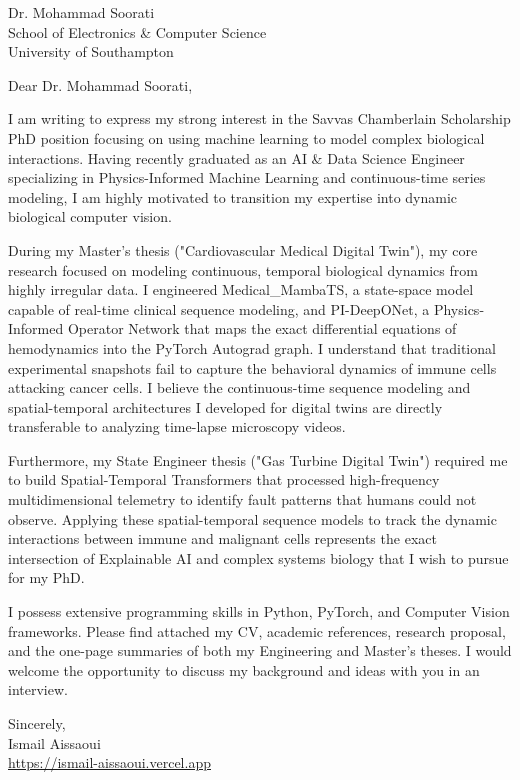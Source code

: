 \documentclass[11pt, a4paper]{letter}
\begin{document}
\begin{letter}{Dr. Mohammad Soorati \\ School of Electronics \& Computer Science \\ University of Southampton}
\opening{Dear Dr. Mohammad Soorati,}

I am writing to express my strong interest in the Savvas Chamberlain Scholarship PhD position focusing on using machine learning to model complex biological interactions. Having recently graduated as an AI \& Data Science Engineer specializing in Physics-Informed Machine Learning and continuous-time series modeling, I am highly motivated to transition my expertise into dynamic biological computer vision.

During my Master's thesis ("Cardiovascular Medical Digital Twin"), my core research focused on modeling continuous, temporal biological dynamics from highly irregular data. I engineered Medical\_MambaTS, a state-space model capable of real-time clinical sequence modeling, and PI-DeepONet, a Physics-Informed Operator Network that maps the exact differential equations of hemodynamics into the PyTorch Autograd graph. I understand that traditional experimental snapshots fail to capture the behavioral dynamics of immune cells attacking cancer cells. I believe the continuous-time sequence modeling and spatial-temporal architectures I developed for digital twins are directly transferable to analyzing time-lapse microscopy videos.

Furthermore, my State Engineer thesis ("Gas Turbine Digital Twin") required me to build Spatial-Temporal Transformers that processed high-frequency multidimensional telemetry to identify fault patterns that humans could not observe. Applying these spatial-temporal sequence models to track the dynamic interactions between immune and malignant cells represents the exact intersection of Explainable AI and complex systems biology that I wish to pursue for my PhD.

I possess extensive programming skills in Python, PyTorch, and Computer Vision frameworks. Please find attached my CV, academic references, research proposal, and the one-page summaries of both my Engineering and Master's theses. I would welcome the opportunity to discuss my background and ideas with you in an interview.

\closing{Sincerely, \\ Ismail Aissaoui \\ \href{https://ismail-aissaoui.vercel.app}{https://ismail-aissaoui.vercel.app}}
\end{letter}
\end{document}
